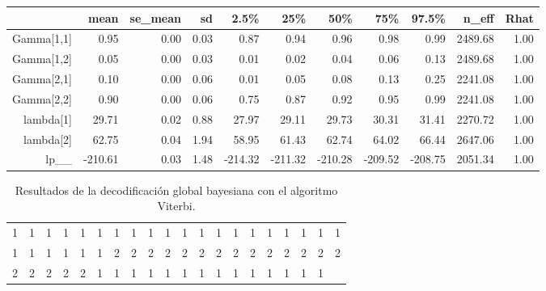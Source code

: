 \documentclass[a4paper]{article}\usepackage[]{graphicx}\usepackage[]{color}
\begin{document}
\begin{table}[ht]
\centering
\begin{tabular}{rrrrrrrrrrr}
  \hline
 & mean & se\_mean & sd & 2.5\% & 25\% & 50\% & 75\% & 97.5\% & n\_eff & Rhat \\ 
  \hline
Gamma[1,1] & 0.95 & 0.00 & 0.03 & 0.87 & 0.94 & 0.96 & 0.98 & 0.99 & 2489.68 & 1.00 \\ 
  Gamma[1,2] & 0.05 & 0.00 & 0.03 & 0.01 & 0.02 & 0.04 & 0.06 & 0.13 & 2489.68 & 1.00 \\ 
  Gamma[2,1] & 0.10 & 0.00 & 0.06 & 0.01 & 0.05 & 0.08 & 0.13 & 0.25 & 2241.08 & 1.00 \\ 
  Gamma[2,2] & 0.90 & 0.00 & 0.06 & 0.75 & 0.87 & 0.92 & 0.95 & 0.99 & 2241.08 & 1.00 \\ 
  lambda[1] & 29.71 & 0.02 & 0.88 & 27.97 & 29.11 & 29.73 & 30.31 & 31.41 & 2270.72 & 1.00 \\ 
  lambda[2] & 62.75 & 0.04 & 1.94 & 58.95 & 61.43 & 62.74 & 64.02 & 66.44 & 2647.06 & 1.00 \\ 
  lp\_\_ & -210.61 & 0.03 & 1.48 & -214.32 & -211.32 & -210.28 & -209.52 & -208.75 & 2051.34 & 1.00 \\ 
   \hline
\end{tabular}
\end{table}


\begin{table}[ht]
\centering
\begin{tabular}{rrrrrrrrrrrrrrrrrrrr}
  \hline
  \hline
1 & 1 & 1 & 1 & 1 & 1 & 1 & 1 & 1 & 1 & 1 & 1 & 1 & 1 & 1 & 1 & 1 & 1 & 1 & 1 \\ 
  1 & 1 & 1 & 1 & 1 & 1 & 2 & 2 & 2 & 2 & 2 & 2 & 2 & 2 & 2 & 2 & 2 & 2 & 2 & 2 \\ 
  2 & 2 & 2 & 2 & 2 & 1 & 1 & 1 & 1 & 1 & 1 & 1 & 1 & 1 & 1 & 1 & 1 & 1 & 1 &  \\ 
   \hline
\end{tabular}
\caption{Resultados de la decodificación global bayesiana con el algoritmo Viterbi.} 
\end{table}
\end{document}
